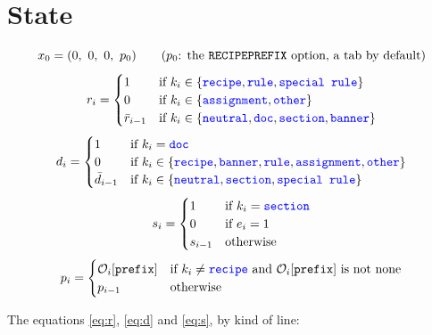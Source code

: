 \documentclass[11pt]{article}
\newcommand{\code}[1]{\mbox{\texttt{#1}}}
\newcommand{\kind}[1]{\textcolor{blue}{\texttt{#1}}}
\newcommand{\field}[1]{\texttt{#1}}
\newcommand{\Obs}[1]{\mathcal{O}_i[\field{#1}]}
\begin{document}
\section{State}
\label{sec:state}

\begin{equation}
  x_0 = (0,\ 0,\ 0,\ p_0)
  \qquad \text{($p_0$: the \code{RECIPEPREFIX} option, a tab by default)}
  \label{eq:init}
\end{equation}
\begin{equation}
  r_i =
  \begin{cases}
    1 & \text{if } k_i \in \{\kind{recipe}, \kind{rule}, \kind{special rule}\}\\
    0 & \text{if } k_i \in \{\kind{assignment}, \kind{other}\}\\
    \bar r_{i-1} & \text{if } k_i \in \{\kind{neutral}, \kind{doc}, \kind{section},
                   \kind{banner}\}
  \end{cases}
  \label{eq:r}
\end{equation}
\begin{equation}
  d_i =
  \begin{cases}
    1 & \text{if } k_i = \kind{doc}\\
    0 & \text{if } k_i \in \{\kind{recipe}, \kind{banner}, \kind{rule}, \kind{assignment},
                              \kind{other}\}\\
    \bar d_{i-1} & \text{if } k_i \in \{\kind{neutral}, \kind{section},
                   \kind{special rule}\}
  \end{cases}
  \label{eq:d}
\end{equation}
\begin{equation}
  s_i =
  \begin{cases}
    1 & \text{if } k_i = \kind{section}\\
    0 & \text{if } e_i = 1\\
    s_{i-1} & \text{otherwise}
  \end{cases}
  \label{eq:s}
\end{equation}
\begin{equation}
  p_i =
  \begin{cases}
    \Obs{prefix} & \text{if } k_i \ne \kind{recipe} \text{ and } \Obs{prefix} \text{ is not
                   none}\\
    p_{i-1} & \text{otherwise}
  \end{cases}
  \label{eq:p}
\end{equation}

\noindent The equations \eqref{eq:r}, \eqref{eq:d} and \eqref{eq:s}, by kind of line:
\end{document}
